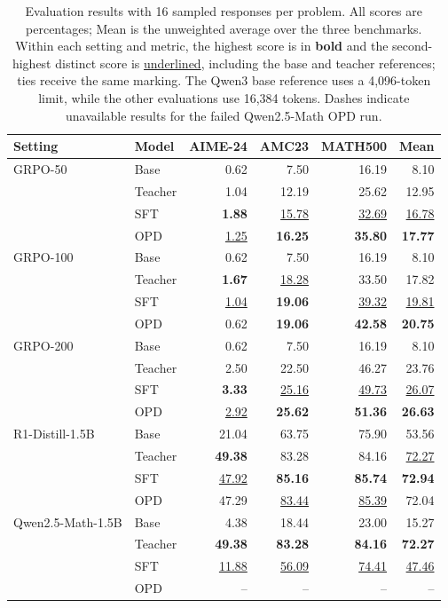 \begin{table}[htbp]
\centering
\small
\setlength{\tabcolsep}{5pt}
\begin{tabular}{llrrrr}
\toprule
Setting & Model & AIME-24 & AMC23 & MATH500 & Mean \\
\midrule
GRPO-50 & Base & 0.62 & 7.50 & 16.19 & 8.10 \\
 & Teacher & 1.04 & 12.19 & 25.62 & 12.95 \\
 & SFT & \textbf{1.88} & \underline{15.78} & \underline{32.69} & \underline{16.78} \\
 & OPD & \underline{1.25} & \textbf{16.25} & \textbf{35.80} & \textbf{17.77} \\
\midrule
GRPO-100 & Base & 0.62 & 7.50 & 16.19 & 8.10 \\
 & Teacher & \textbf{1.67} & \underline{18.28} & 33.50 & 17.82 \\
 & SFT & \underline{1.04} & \textbf{19.06} & \underline{39.32} & \underline{19.81} \\
 & OPD & 0.62 & \textbf{19.06} & \textbf{42.58} & \textbf{20.75} \\
\midrule
GRPO-200 & Base & 0.62 & 7.50 & 16.19 & 8.10 \\
 & Teacher & 2.50 & 22.50 & 46.27 & 23.76 \\
 & SFT & \textbf{3.33} & \underline{25.16} & \underline{49.73} & \underline{26.07} \\
 & OPD & \underline{2.92} & \textbf{25.62} & \textbf{51.36} & \textbf{26.63} \\
\midrule
R1-Distill-1.5B & Base & 21.04 & 63.75 & 75.90 & 53.56 \\
 & Teacher & \textbf{49.38} & 83.28 & 84.16 & \underline{72.27} \\
 & SFT & \underline{47.92} & \textbf{85.16} & \textbf{85.74} & \textbf{72.94} \\
 & OPD & 47.29 & \underline{83.44} & \underline{85.39} & 72.04 \\
\midrule
Qwen2.5-Math-1.5B & Base & 4.38 & 18.44 & 23.00 & 15.27 \\
 & Teacher & \textbf{49.38} & \textbf{83.28} & \textbf{84.16} & \textbf{72.27} \\
 & SFT & \underline{11.88} & \underline{56.09} & \underline{74.41} & \underline{47.46} \\
 & OPD & -- & -- & -- & -- \\
\bottomrule
\end{tabular}
\caption{Evaluation results with 16 sampled responses per problem.
All scores are percentages; Mean is the unweighted average over the
three benchmarks. Within each setting and metric, the highest score
is in \textbf{bold} and the second-highest distinct score is
\underline{underlined}, including the base and teacher references;
ties receive the same marking. The Qwen3 base reference uses a
4,096-token limit, while the other evaluations use 16,384 tokens.
Dashes indicate unavailable results for the failed Qwen2.5-Math OPD run.}
\label{tab:distillation-performance}
\end{table}

